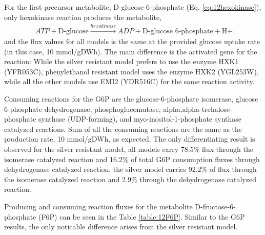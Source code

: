 For the first precursor metabolite, D-glucose-6-phosphate (Eq. \ref{eq:12hexokinase}), only hexokinase reaction produces the metabolite,
\begin{align}
\label{eq:12hexokinase}
\ ATP + \text{D-glucose} \xrightarrow{hexokinase} ADP + \text{D-glucose 6-phosphate} + \text{H+}
\end{align}
and the flux values for all models is the same at the provided glucose uptake rate (in this case, 10 mmol/gDWh). The main difference is the activated gene for the reaction: While the silver resistant model prefers to use the enzyme HXK1 (YFR053C), phenylethanol resistant model uses the enzyme HXK2 (YGL253W), while all the other models use EMI2 (YDR516C) for the same reaction activity.

Consuming reactions for the G6P are the glucose-6-phosphate isomerase, glucose 6-phosphate dehydrogenase, phosphoglucomutase, alpha,alpha-trehalose-phosphate synthase (UDP-forming), and myo-inositol-1-phosphate synthase catalyzed reactions. Sum of all the consuming reactions are the same as the production rate, 10 mmol/gDWh, as expected. The only differentiating result is observed for the silver resistant model, all models carry 78.5\% flux through the isomerase catalyzed reaction and 16.2\% of total G6P consumption fluxes through dehydrogenase catalyzed reaction, the silver model carries 92.2\% of flux through the isomerase catalyzed reaction and 2.9\% through the dehydrogenase catalyzed reaction.

Producing and consuming reaction fluxes for the metabolite D-fructose-6-phosphate (F6P) can be seen in the Table \ref{table:12F6P}. Similar to the G6P results, the only noticable difference arises from the silver resistant model.

